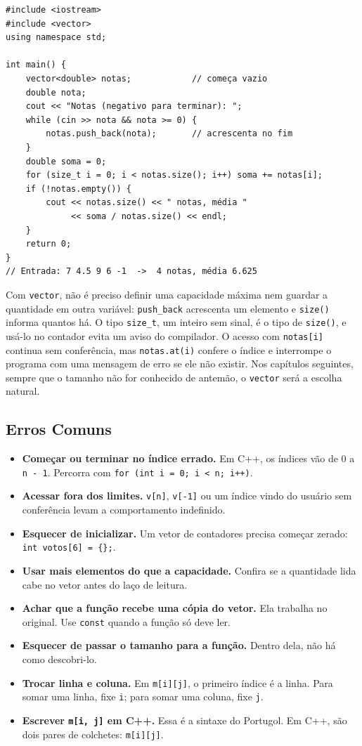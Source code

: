 \begin{codigo}
\begin{Verbatim}[breaklines=true, breaksymbolleft={}, fontsize=\footnotesize]
#include <iostream>
#include <vector>
using namespace std;

int main() {
    vector<double> notas;            // começa vazio
    double nota;
    cout << "Notas (negativo para terminar): ";
    while (cin >> nota && nota >= 0) {
        notas.push_back(nota);       // acrescenta no fim
    }
    double soma = 0;
    for (size_t i = 0; i < notas.size(); i++) soma += notas[i];
    if (!notas.empty()) {
        cout << notas.size() << " notas, média "
             << soma / notas.size() << endl;
    }
    return 0;
}
// Entrada: 7 4.5 9 6 -1  ->  4 notas, média 6.625
\end{Verbatim}
\end{codigo}

Com \texttt{vector}, não é preciso definir uma capacidade máxima nem guardar a quantidade em outra variável: \texttt{push\_back} acrescenta um elemento e \texttt{size()} informa quantos há. O tipo \texttt{size\_t}, um inteiro sem sinal, é o tipo de \texttt{size()}, e usá-lo no contador evita um aviso do compilador. O acesso com \texttt{notas[i]} continua sem conferência, mas \texttt{notas.at(i)} confere o índice e interrompe o programa com uma mensagem de erro se ele não existir. Nos capítulos seguintes, sempre que o tamanho não for conhecido de antemão, o \texttt{vector} será a escolha natural.

\subsection{Erros Comuns}

\begin{itemize}
  \item \textbf{Começar ou terminar no índice errado.} Em C++, os índices vão de 0 a \texttt{n - 1}. Percorra com \texttt{for (int i = 0; i < n; i++)}.
  \item \textbf{Acessar fora dos limites.} \texttt{v[n]}, \texttt{v[-1]} ou um índice vindo do usuário sem conferência levam a comportamento indefinido.
  \item \textbf{Esquecer de inicializar.} Um vetor de contadores precisa começar zerado: \texttt{int votos[6] = \{\};}.
  \item \textbf{Usar mais elementos do que a capacidade.} Confira se a quantidade lida cabe no vetor antes do laço de leitura.
  \item \textbf{Achar que a função recebe uma cópia do vetor.} Ela trabalha no original. Use \texttt{const} quando a função só deve ler.
  \item \textbf{Esquecer de passar o tamanho para a função.} Dentro dela, não há como descobri-lo.
  \item \textbf{Trocar linha e coluna.} Em \texttt{m[i][j]}, o primeiro índice é a linha. Para somar uma linha, fixe \texttt{i}; para somar uma coluna, fixe \texttt{j}.
  \item \textbf{Escrever \texttt{m[i, j]} em C++.} Essa é a sintaxe do Portugol. Em C++, são dois pares de colchetes: \texttt{m[i][j]}.
\end{itemize}
